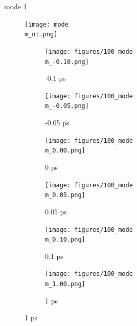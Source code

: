 \documentclass{beamer}
\newcommand\w{0.32}
\begin{document}
\renewcommand\m{1}
\begin{frame}{mode \m}
	\vspace{\vh mm}
	\begin{figure}
		\centering
		\texttt{[image: mode\\m\_ot.png]}
	\end{figure}
	\begin{figure}
		\centering
		\begin{subfigure}[b]{\w\textwidth}
			\centering
			\texttt{[image: figures/100\_mode\\m\_-0.10.png]}
			\caption{-0.1 ps}
		\end{subfigure}
		\begin{subfigure}[b]{\w\textwidth}
			\centering
			\texttt{[image: figures/100\_mode\\m\_-0.05.png]}
			\caption{-0.05 ps}
		\end{subfigure}
		\begin{subfigure}[b]{\w\textwidth}
			\centering
			\texttt{[image: figures/100\_mode\\m\_0.00.png]}
			\caption{0 ps}
		\end{subfigure}
		\begin{subfigure}[b]{\w\textwidth}
			\centering
			\texttt{[image: figures/100\_mode\\m\_0.05.png]}
			\caption{0.05 ps}
		\end{subfigure}
		\begin{subfigure}[b]{\w\textwidth}
			\centering
			\texttt{[image: figures/100\_mode\\m\_0.10.png]}
			\caption{0.1 ps}
		\end{subfigure}
		\begin{subfigure}[b]{\w\textwidth}
			\centering
			\texttt{[image: figures/100\_mode\\m\_1.00.png]}
			\caption{1 ps}
		\end{subfigure}
	\end{figure}
\end{frame}

\renewcommand\m{2}
\end{document}
